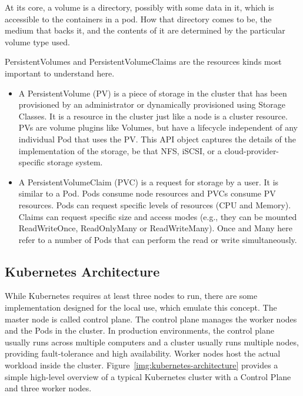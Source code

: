 At its core, a volume is a directory, possibly with some data in it, which is accessible to the containers in a pod. How that directory comes to be, the medium that backs it, and the contents of it are determined by the particular volume type used.

PersistentVolumes and PersistentVolumeClaims are the resources kinds most important to understand here.
\begin{itemize}
\item A PersistentVolume (PV) is a piece of storage in the cluster that has been provisioned by an administrator or dynamically provisioned using Storage Classes. It is a resource in the cluster just like a node is a cluster resource. PVs are volume plugins like Volumes, but have a lifecycle independent of any individual Pod that uses the PV. This API object captures the details of the implementation of the storage, be that NFS, iSCSI, or a cloud-provider-specific storage system.
\item A PersistentVolumeClaim (PVC) is a request for storage by a user. It is similar to a Pod. Pods consume node resources and PVCs consume PV resources. Pods can request specific levels of resources (CPU and Memory). Claims can request specific size and access modes (e.g., they can be mounted ReadWriteOnce, ReadOnlyMany or ReadWriteMany). Once and Many here refer to a number of Pods that can perform the read or write simultaneously.
\end{itemize}

\subsection{Kubernetes Architecture}

While Kubernetes requires at least three nodes to run, there are some implementation designed for the local use, which emulate this concept. The master node is called control plane. The control plane manages the worker nodes and the Pods in the cluster. In production environments, the control plane usually runs across multiple computers and a cluster usually runs multiple nodes, providing fault-tolerance and high availability. Worker nodes host the actual workload inside the cluster. Figure~\ref{img:kubernetes-architecture} provides a simple high-level overview of a typical Kubernetes cluster with a Control Plane and three worker nodes.

